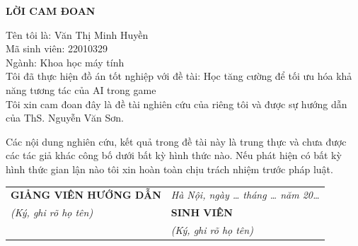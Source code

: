 \fontsize{13pt}{22.5pt}\selectfont
\begin{center}
    {\large\bfseries LỜI CAM ĐOAN}
\end{center}

\vspace{0.5cm}

\noindent Tên tôi là: Văn Thị Minh Huyền \\
\noindent Mã sinh viên: 22010329\\
\noindent Ngành: Khoa học máy tính\\
\noindent Tôi đã thực hiện đồ án tốt nghiệp với đề tài: Học tăng cường để tối ưu hóa khả năng tương tác của AI trong game
\noindent\\
\indent Tôi xin cam đoan đây là đề tài nghiên cứu của riêng tôi và được sự hướng dẫn
của ThS. Nguyễn Văn Sơn.

\indent Các nội dung nghiên cứu, kết quả trong đề tài này là trung thực và chưa được
các tác giả khác công bố dưới bất kỳ hình thức nào. Nếu phát hiện có bất kỳ hình thức
gian lận nào tôi xin hoàn toàn chịu trách nhiệm trước pháp luật.

\vspace{1.5cm}

\noindent
\begin{tabular}{p{} p{}}
    \textbf{GIẢNG VIÊN HƯỚNG DẪN}  &  \textit{Hà Nội, ngày \ldots{} tháng \ldots{} năm 20\ldots} \\[0.2cm]
    \quad\quad\textit{(Ký, ghi rõ họ tên)}    &  \quad\quad\quad\quad\textbf{SINH VIÊN}                                          \\[0.0cm]
                                    &  \quad\quad\quad\textit{(Ký, ghi rõ họ tên)}
\end{tabular}
